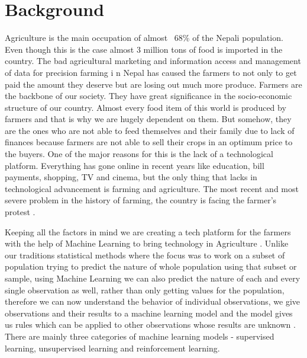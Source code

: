 \section{Background}\label{sec:bkgrnd}%
Agriculture is the main occupation of almost \
68\% of the Nepali population. Even though this is the case almost
 3 million tons of food is imported in the country. The bad agricultural 
 marketing and information access and management of data for precision farming i
 n Nepal has caused the farmers to not only to get paid the amount they 
 deserve but are losing out much more produce. Farmers are the backbone of our society. They have 
 great significance in the socio-economic structure of our country. 
 Almost every food item of this world is produced by farmers and that is
 why we are hugely dependent on them. But somehow, they are the ones who are not able to 
 feed themselves and their family due to lack of finances because farmers
 are not able to sell their crops in an optimum price to the buyers. 
 One of the major reasons for this is the lack of a technological platform.
 Everything has gone online in recent years like education, bill payments, shopping, 
 TV and cinema, but the only thing that lacks in technological advancement is 
 farming and agriculture. The most recent and most severe problem in the 
 history of farming, the country is facing the farmer’s protest \cite{ahmed2013farm}.\par
 Keeping all the factors in mind we are creating a tech platform for the farmers with the help 
 of Machine Learning to bring technology in Agriculture \cite{soni2010agricultural}. Unlike our traditions 
 statistical methods where the focus was to work on a subset of population trying to 
 predict the nature of whole population using that subset or sample, using Machine 
 Learning we can also predict the nature of each and every single observation as well, 
 rather than only getting values for the population, therefore we can now understand 
 the behavior of individual observations, we give observations and their results to a 
 machine learning model and the model gives us rules which can be applied to other 
 observations whose results are unknown \cite{bagheri2011adoption,biggs2011patterns,biggs2015rural,pingali1987agricultural}. There are mainly three categories of
  machine learning models - supervised learning, unsupervised learning and reinforcement learning.\\
  \\

